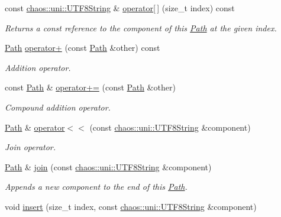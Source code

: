 \begin{DoxyCompactItemize}
const \hyperlink{classchaos_1_1uni_1_1_u_t_f8_string}{chaos\-::uni\-::\-U\-T\-F8\-String} \& \hyperlink{classchaos_1_1io_1_1sys_1_1_path_aa3ee2fea4946e94c9bdb692bdffed522}{operator\mbox{[}$\,$\mbox{]}} (size\-\_\-t index) const 
\begin{DoxyCompactList}\small\item\em Returns a const reference to the component of this \hyperlink{classchaos_1_1io_1_1sys_1_1_path}{Path} at the given index. \end{DoxyCompactList}\item 
\hyperlink{classchaos_1_1io_1_1sys_1_1_path}{Path} \hyperlink{classchaos_1_1io_1_1sys_1_1_path_a5e769fd87717e15f0580e9aacbc0a418}{operator+} (const \hyperlink{classchaos_1_1io_1_1sys_1_1_path}{Path} \&other) const 
\begin{DoxyCompactList}\small\item\em Addition operator. \end{DoxyCompactList}\item 
const \hyperlink{classchaos_1_1io_1_1sys_1_1_path}{Path} \& \hyperlink{classchaos_1_1io_1_1sys_1_1_path_a92a616d9f16047d8933020bab54ed494}{operator+=} (const \hyperlink{classchaos_1_1io_1_1sys_1_1_path}{Path} \&other)
\begin{DoxyCompactList}\small\item\em Compound addition operator. \end{DoxyCompactList}\item 
\hyperlink{classchaos_1_1io_1_1sys_1_1_path}{Path} \& \hyperlink{classchaos_1_1io_1_1sys_1_1_path_a9b3f24e1f3bcb8e989c4b21d70d0a052}{operator$<$$<$} (const \hyperlink{classchaos_1_1uni_1_1_u_t_f8_string}{chaos\-::uni\-::\-U\-T\-F8\-String} \&component)
\begin{DoxyCompactList}\small\item\em Join operator. \end{DoxyCompactList}\item 
\hyperlink{classchaos_1_1io_1_1sys_1_1_path}{Path} \& \hyperlink{classchaos_1_1io_1_1sys_1_1_path_a8fcd75bd349c4c6d1286f6549e34de8c}{join} (const \hyperlink{classchaos_1_1uni_1_1_u_t_f8_string}{chaos\-::uni\-::\-U\-T\-F8\-String} \&component)
\begin{DoxyCompactList}\small\item\em Appends a new component to the end of this \hyperlink{classchaos_1_1io_1_1sys_1_1_path}{Path}. \end{DoxyCompactList}\item 
void \hyperlink{classchaos_1_1io_1_1sys_1_1_path_a7dc2fc570f8475ba5147bffb01de7025}{insert} (size\-\_\-t index, const \hyperlink{classchaos_1_1uni_1_1_u_t_f8_string}{chaos\-::uni\-::\-U\-T\-F8\-String} \&component)

\end{DoxyCompactItemize}
